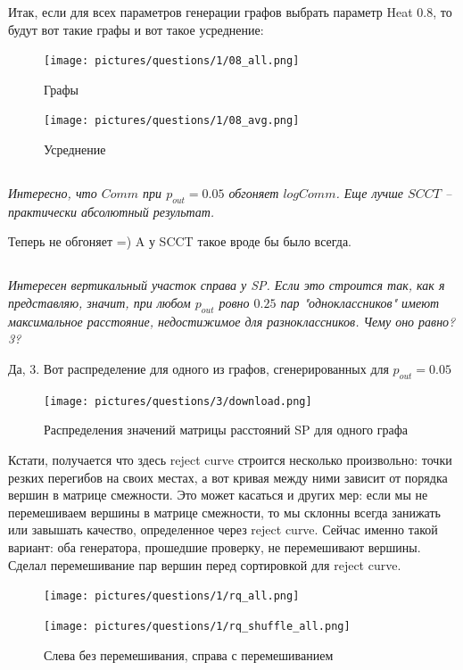 \documentclass{article}
\begin{document}
Итак, если для всех параметров генерации графов выбрать параметр Heat 0.8, то будут вот такие графы и вот такое усреднение:

\begin{figure}[H]
	\texttt{[image: pictures/questions/1/08\_all.png]}
	\caption{\label{f_vs2} Графы}
\end{figure}

\begin{figure}[H]
	\texttt{[image: pictures/questions/1/08\_avg.png]}
	\caption{\label{f_vs2} Усреднение}
\end{figure}  

\subsection{}
\textit{Интересно, что $Comm$ при $p_{out} = 0.05$ обгоняет $logComm$. Еще лучше $SCCT$ -- практически абсолютный результат.}

Теперь не обгоняет =)
A у SCCT такое вроде бы было всегда.


\subsection{}
\textit{Интересен вертикальный участок справа у SP. Если это строится так, как я представляю, значит, при любом $p_{out}$ ровно $0.25$ пар "одноклассников" имеют максимальное расстояние, недостижимое для разноклассников. Чему оно равно? 3?}

Да, 3. Вот распределение для одного из графов, сгенерированных для $p_{out} = 0.05$
\begin{figure}[H]
	\texttt{[image: pictures/questions/3/download.png]}
	\caption{\label{f_vs2} Распределения значений матрицы расстояний SP для одного графа}
\end{figure}
Кстати, получается что здесь reject curve строится несколько произвольно: точки резких перегибов на своих местах, а вот кривая между ними зависит от порядка вершин в матрице смежности. Это может касаться и других мер: если мы не перемешиваем вершины в матрице смежности, то мы склонны всегда занижать или завышать качество, определенное через reject curve. Сейчас именно такой вариант: оба генератора, прошедшие проверку, не перемешивают вершины.
Сделал перемешивание пар вершин перед сортировкой для reject curve. 

\begin{figure}[H] %
	\begin{minipage}{.5\textwidth}
		\centerline{
			\texttt{[image: pictures/questions/1/rq\_all.png]}
		}
	\end{minipage}%
	\begin{minipage}{.5\textwidth}
		\centerline{
			\texttt{[image: pictures/questions/1/rq\_shuffle\_all.png]}
		}
	\end{minipage}%
\caption{\label{f_Rcur} Слева без перемешивания, справа с перемешиванием}
\end{figure}
\end{document}
